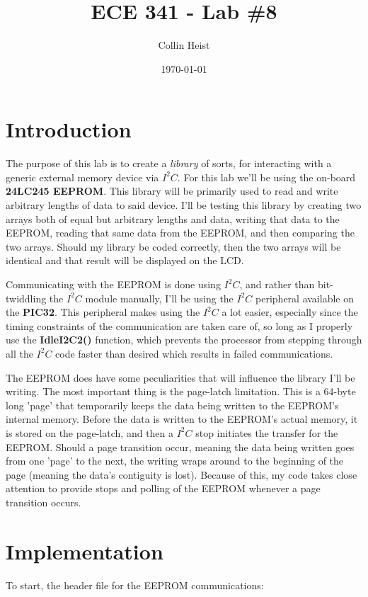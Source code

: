 \documentclass[a4paper, 12pt]{article}
\begin{document}
\title{ECE 341 - Lab \#8}
\author{Collin Heist}
\date{\today}
\maketitle
{}
\tableofcontents
\lstlistoflistings
\newpage
{}

\section{Introduction}
The purpose of this lab is to create a \textit{library} of sorts, for interacting with a generic external memory device via $I^2C$. For this lab we'll be using the on-board \textbf{24LC245 EEPROM}. This library will be primarily used to read and write arbitrary lengths of data to said device. I'll be testing this library by creating two arrays both of equal but arbitrary lengths and data, writing that data to the EEPROM, reading that same data from the EEPROM, and then comparing the two arrays. Should my library be coded correctly, then the two arrays will be identical and that result will be displayed on the LCD.

Communicating with the EEPROM is done using $I^2C$, and rather than bit-twiddling the $I^2C$ module manually, I'll be using the $I^2C$ peripheral available on the \textbf{PIC32}. This peripheral makes using the $I^2C$ a lot easier, especially since the timing constraints of the communication are taken care of, so long as I properly use the \textbf{IdleI2C2()} function, which prevents the processor from stepping through all the $I^2C$ code faster than desired which results in failed communications.

The EEPROM does have some peculiarities that will influence the library I'll be writing. The most important thing is the page-latch limitation. This is a 64-byte long 'page' that temporarily keeps the data being written to the EEPROM's internal memory. Before the data is written to the EEPROM's actual memory, it is stored on the page-latch, and then a $I^2C$ stop initiates the transfer for the EEPROM. Should a page transition occur, meaning the data being written goes from one 'page' to the next, the writing wraps around to the beginning of the page (meaning the data's contiguity is lost). Because of this, my code takes close attention to provide stops and polling of the EEPROM whenever a page transition occurs.

\section{Implementation}
To start, the header file for the EEPROM communications:
\end{document}
